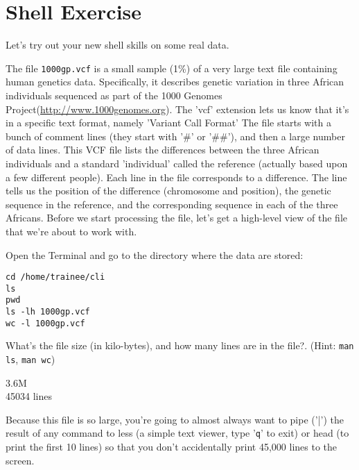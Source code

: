\newpage
\section{Shell Exercise}

\begin{information}
Let's try out your new shell skills on some real data.

The file \texttt{1000gp.vcf} is a small sample (1\%) of a very large text file containing human genetics data. Specifically, it describes genetic variation in three African individuals sequenced as part of the 1000 Genomes Project(\url{http://www.1000genomes.org}).
The 'vcf' extension lets us know that it's in a specific text format, namely 'Variant Call Format' The file starts with a bunch of comment lines (they start with '\#' or '\#\#'), and then a large number of data lines. This VCF file lists the differences between the three African individuals and a standard 'individual' called the reference (actually based upon a few different people). Each line in the file corresponds to a difference. The line tells us the position of the difference (chromosome and position), the genetic sequence in the reference, and the corresponding sequence in each of the three Africans.
Before we start processing the file, let's get a high-level view of the file that we're about to work with.

\end{information}

\begin{steps}
Open the Terminal and go to the directory where the data are stored:
\begin{lstlisting}
cd /home/trainee/cli
ls
pwd
ls -lh 1000gp.vcf
wc -l 1000gp.vcf
\end{lstlisting}
\end{steps}

\begin{questions}
What's the file size (in kilo-bytes), and how many lines are in the file?. (Hint: \texttt{man ls}, \texttt{man wc}) \\
\begin{answer}
3.6M \\
45034 lines \\
\end{answer}
\end{questions}


\begin{note}
Because this file is so large, you're going to almost always want to pipe ('|') the result of any command to less (a simple text viewer, type '\texttt{q}' to exit) or head (to print the first 10 lines) so that you don't accidentally print 45,000 lines to the screen.
\end{note}


